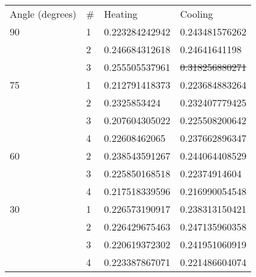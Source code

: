 \begin{tabular}{l l | l l}
Angle (degrees) & # & Heating & Cooling\\
90 & 1 & 0.223284242942 & 0.243481576262\\
& 2 & 0.246684312618 & 0.24641641198\\
& 3 & 0.255505537961 & \sout{0.318256880271}\\
75 & 1 & 0.212791418373 & 0.223684883264\\
& 2 & 0.2325853424 & 0.232407779425\\
& 3 & 0.207604305022 & 0.225508200642\\
& 4 & 0.22608462065 & 0.237662896347\\
60 & 2 & 0.238543591267 & 0.244064408529\\
& 3 & 0.225850168518 & 0.22374914604\\
& 4 & 0.217518339596 & 0.216990054548\\
30 & 1 & 0.226573190917 & 0.238313150421\\
& 2 & 0.226429675463 & 0.247135960358\\
& 3 & 0.220619372302 & 0.241951060919\\
& 4 & 0.223387867071 & 0.221486604074\\
\end{tabular}
